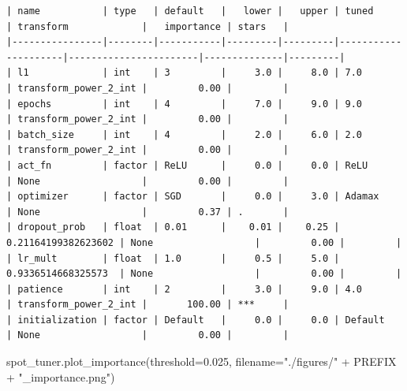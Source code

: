\documentclass[
  letterpaper,
  DIV=11,
  numbers=noendperiod]{scrreprt}
\newenvironment{Shaded}{\begin{snugshade}}{\end{snugshade}}
\newcommand{\FloatTok}[1]{\textcolor[rgb]{0.68,0.00,0.00}{#1}}
\newcommand{\NormalTok}[1]{\textcolor[rgb]{0.00,0.23,0.31}{#1}}
\newcommand{\OperatorTok}[1]{\textcolor[rgb]{0.37,0.37,0.37}{#1}}
\newcommand{\StringTok}[1]{\textcolor[rgb]{0.13,0.47,0.30}{#1}}
\begin{document}
\begin{verbatim}
| name           | type   | default   |   lower |   upper | tuned               | transform             |   importance | stars   |
|----------------|--------|-----------|---------|---------|---------------------|-----------------------|--------------|---------|
| l1             | int    | 3         |     3.0 |     8.0 | 7.0                 | transform_power_2_int |         0.00 |         |
| epochs         | int    | 4         |     7.0 |     9.0 | 9.0                 | transform_power_2_int |         0.00 |         |
| batch_size     | int    | 4         |     2.0 |     6.0 | 2.0                 | transform_power_2_int |         0.00 |         |
| act_fn         | factor | ReLU      |     0.0 |     0.0 | ReLU                | None                  |         0.00 |         |
| optimizer      | factor | SGD       |     0.0 |     3.0 | Adamax              | None                  |         0.37 | .       |
| dropout_prob   | float  | 0.01      |    0.01 |    0.25 | 0.21164199382623602 | None                  |         0.00 |         |
| lr_mult        | float  | 1.0       |     0.5 |     5.0 | 0.9336514668325573  | None                  |         0.00 |         |
| patience       | int    | 2         |     3.0 |     9.0 | 4.0                 | transform_power_2_int |       100.00 | ***     |
| initialization | factor | Default   |     0.0 |     0.0 | Default             | None                  |         0.00 |         |
\end{verbatim}

\begin{Shaded}
\begin{Highlighting}[]
\NormalTok{spot\_tuner.plot\_importance(threshold}\OperatorTok{=}\FloatTok{0.025}\NormalTok{,}
\NormalTok{    filename}\OperatorTok{=}\StringTok{"./figures/"} \OperatorTok{+}\NormalTok{ PREFIX }\OperatorTok{+} \StringTok{"\_importance.png"}\NormalTok{)}
\end{Highlighting}
\end{Shaded}
\end{document}
